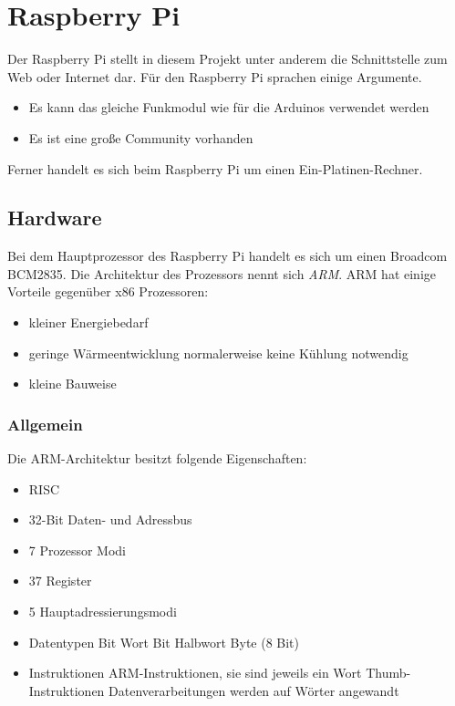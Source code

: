 \section{Raspberry Pi}
\label{sec:raspiBasics}
Der Raspberry Pi stellt in diesem Projekt unter anderem die Schnittstelle zum Web oder Internet dar. Für den Raspberry Pi sprachen einige Argumente.
\begin{itemize}
\item Es kann das gleiche Funkmodul wie für die Arduinos verwendet werden
\item Es ist eine große Community vorhanden
\end{itemize}
Ferner handelt es sich beim Raspberry Pi um einen Ein-Platinen-Rechner. 

\subsection{Hardware}
Bei dem Hauptprozessor des Raspberry Pi handelt es sich um einen Broadcom BCM2835. Die Architektur des Prozessors nennt sich \textit{ARM}. ARM hat einige Vorteile gegenüber x86 Prozessoren: 
\begin{itemize}
\item kleiner Energiebedarf
\item geringe Wärmeentwicklung
\subitem normalerweise keine Kühlung notwendig
\item kleine Bauweise
\end{itemize}

\subsubsection{Allgemein}
Die ARM-Architektur besitzt folgende Eigenschaften: 
\begin{itemize}
\item \ac{RISC}
\item 32-Bit Daten- und Adressbus
\item 7 Prozessor Modi
\item 37 Register
\item 5 Hauptadressierungsmodi
\item Datentypen
 Bit Wort
 Bit Halbwort
\subitem Byte (8 Bit)
\item Instruktionen
 ARM-Instruktionen, sie sind jeweils ein Wort
 Thumb-Instruktionen
\subitem Datenverarbeitungen werden auf Wörter angewandt
\end{itemize}

